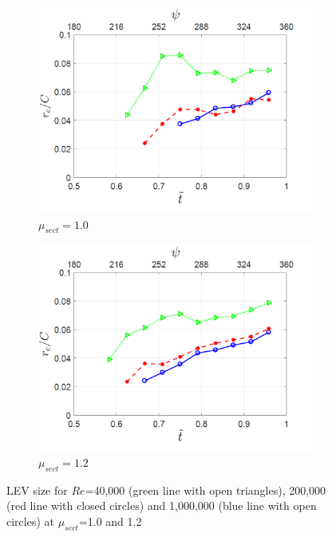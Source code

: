 \begin{figure}[H]
	\begin{subfigure}{0.5\textwidth}
		\includegraphics[width=1\textwidth]{figures/LEV_size_lambda_1pt0.png}
		\caption{$\mu_{sect} = 1.0$}
		\label{fig:LEV_size_lambda_1p0}
	\end{subfigure}
 	\begin{subfigure}{0.5\textwidth}
	\includegraphics[width=1\textwidth]{figures/LEV_size_lambda_1pt2.png}
	\caption{$\mu_{sect} = 1.2$}
	\label{fig:LEV_size_lambda_1p2}
	\end{subfigure}
 	\caption{LEV size for $Re$=40,000 (green line with open triangles), 200,000 (red line with closed circles) and 1,000,000 (blue line with open circles) at $\mu_{sect}$=1.0 and 1.2}
 	\label{fig:LEV_size}
\end{figure}


